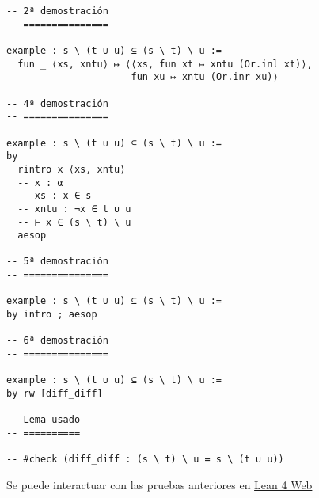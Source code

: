 \begin{verbatim}
-- 2ª demostración
-- ===============

example : s \ (t ∪ u) ⊆ (s \ t) \ u :=
  fun _ ⟨xs, xntu⟩ ↦ ⟨⟨xs, fun xt ↦ xntu (Or.inl xt)⟩,
                      fun xu ↦ xntu (Or.inr xu)⟩

-- 4ª demostración
-- ===============

example : s \ (t ∪ u) ⊆ (s \ t) \ u :=
by
  rintro x ⟨xs, xntu⟩
  -- x : α
  -- xs : x ∈ s
  -- xntu : ¬x ∈ t ∪ u
  -- ⊢ x ∈ (s \ t) \ u
  aesop

-- 5ª demostración
-- ===============

example : s \ (t ∪ u) ⊆ (s \ t) \ u :=
by intro ; aesop

-- 6ª demostración
-- ===============

example : s \ (t ∪ u) ⊆ (s \ t) \ u :=
by rw [diff_diff]

-- Lema usado
-- ==========

-- #check (diff_diff : (s \ t) \ u = s \ (t ∪ u))
\end{verbatim}
Se puede interactuar con las pruebas anteriores en \href{https://lean.math.hhu.de/\#url=https://raw.githubusercontent.com/jaalonso/Calculemus2/main/src/Diferencia\_de\_diferencia\_de\_conjuntos\_2.lean}{Lean 4 Web}

